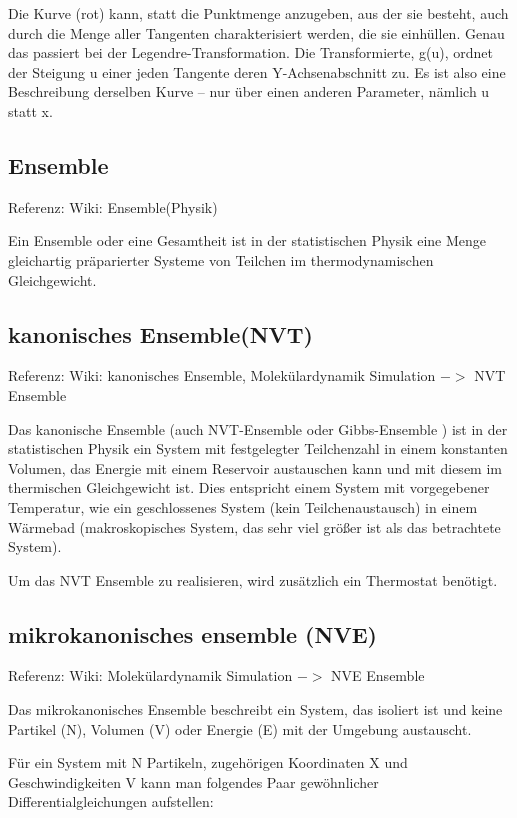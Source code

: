\documentclass[]{article}
\begin{document}
Die Kurve (rot) kann, statt die Punktmenge anzugeben, aus der sie besteht, auch durch die Menge aller Tangenten charakterisiert werden, die sie einhüllen. Genau das passiert bei der Legendre-Transformation. Die Transformierte, g(u), ordnet der Steigung u einer jeden Tangente deren Y-Achsenabschnitt zu. Es ist also eine Beschreibung derselben Kurve – nur über einen anderen Parameter, nämlich u statt x.



\subsection{Ensemble}
Referenz: Wiki: Ensemble(Physik) 

Ein Ensemble oder eine Gesamtheit ist in der statistischen Physik eine Menge gleichartig präparierter Systeme von Teilchen im thermodynamischen Gleichgewicht. 

\subsection{kanonisches Ensemble(NVT)}
Referenz: Wiki: kanonisches Ensemble,  Molekülardynamik Simulation $->$ NVT Ensemble

Das kanonische Ensemble (auch NVT-Ensemble oder Gibbs-Ensemble ) ist in der statistischen Physik ein System mit festgelegter Teilchenzahl in einem konstanten Volumen, das Energie mit einem Reservoir austauschen kann und mit diesem im thermischen Gleichgewicht ist. Dies entspricht einem System mit vorgegebener Temperatur, wie ein geschlossenes System (kein Teilchenaustausch) in einem Wärmebad (makroskopisches System, das sehr viel größer ist als das betrachtete System).

Um das NVT Ensemble zu realisieren, wird zusätzlich ein Thermostat benötigt. 

\subsection{mikrokanonisches ensemble (NVE)}
Referenz: Wiki: Molekülardynamik Simulation $->$ NVE Ensemble

Das mikrokanonisches Ensemble beschreibt ein System, das isoliert ist und keine Partikel (N), Volumen (V) oder Energie (E) mit der Umgebung austauscht.

Für ein System mit N Partikeln, zugehörigen Koordinaten X und Geschwindigkeiten V kann man folgendes Paar gewöhnlicher Differentialgleichungen aufstellen:
\end{document}
